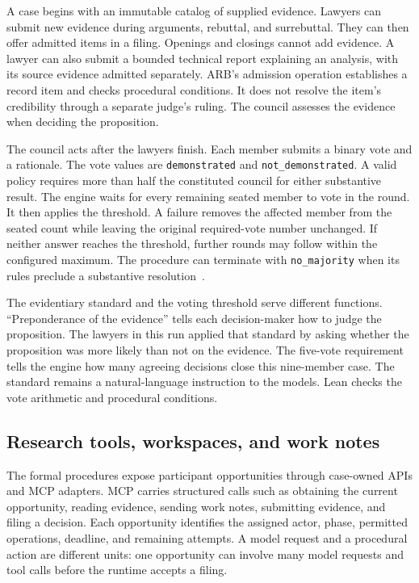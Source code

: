 \documentclass[11pt]{article}
\newcommand{\code}[1]{\texttt{#1}}
\begin{document}
A case begins with an immutable catalog of supplied evidence.  Lawyers can submit new evidence during arguments, rebuttal, and surrebuttal.  They can then offer admitted items in a filing.  Openings and closings cannot add evidence.  A lawyer can also submit a bounded technical report explaining an analysis, with its source evidence admitted separately.  ARB's admission operation establishes a record item and checks procedural conditions.  It does not resolve the item's credibility through a separate judge's ruling.  The council assesses the evidence when deciding the proposition.

The council acts after the lawyers finish.  Each member submits a binary vote and a rationale.  The vote values are \code{demonstrated} and \code{not\_demonstrated}.  A valid policy requires more than half the constituted council for either substantive result.  The engine waits for every remaining seated member to vote in the round.  It then applies the threshold.  A failure removes the affected member from the seated count while leaving the original required-vote number unchanged.  If neither answer reaches the threshold, further rounds may follow within the configured maximum.  The procedure can terminate with \code{no\_majority} when its rules preclude a substantive resolution~\cite{councils}.

The evidentiary standard and the voting threshold serve different functions.  ``Preponderance of the evidence'' tells each decision-maker how to judge the proposition.  The lawyers in this run applied that standard by asking whether the proposition was more likely than not on the evidence.  The five-vote requirement tells the engine how many agreeing decisions close this nine-member case.  The standard remains a natural-language instruction to the models.  Lean checks the vote arithmetic and procedural conditions.

\subsection{Research tools, workspaces, and work notes}

The formal procedures expose participant opportunities through case-owned APIs and MCP adapters.  MCP carries structured calls such as obtaining the current opportunity, reading evidence, sending work notes, submitting evidence, and filing a decision.  Each opportunity identifies the assigned actor, phase, permitted operations, deadline, and remaining attempts.  A model request and a procedural action are different units: one opportunity can involve many model requests and tool calls before the runtime accepts a filing.
\end{document}
